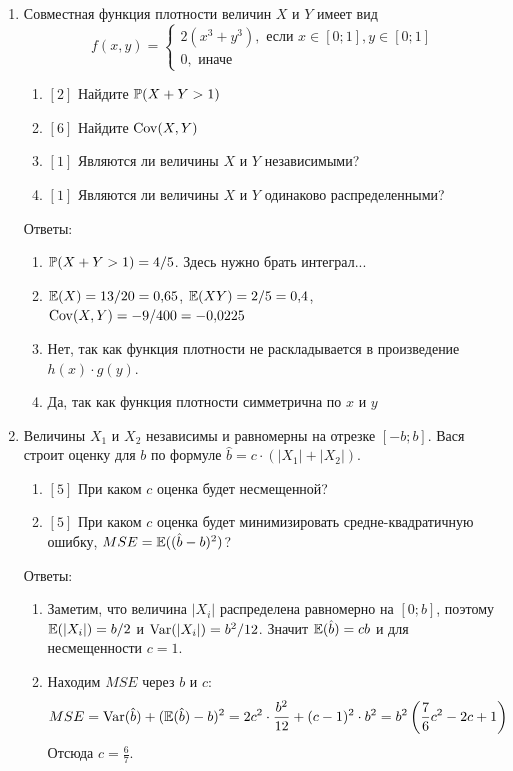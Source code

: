 \documentclass[12pt, a4paper]{article}\usepackage[]{graphicx}\usepackage[]{color}
\begin{document}
		\begin{enumerate}

			\item Совместная функция плотности величин $X$ и $Y$ имеет вид
			\begin{equation}
			f(x,y)=\begin{cases}
			2(x^3+y^3), \mbox{ если } x\in [0;1], y\in [0;1] \\
			0, \mbox{ иначе}
			\end{cases}
			\end{equation}
			\begin{enumerate}
				\item $[2]$ Найдите $\P(X+Y>1)$
				\item $[6]$ Найдите $\Cov(X,Y)$
				\item $[1]$ Являются ли величины $X$ и $Y$ независимыми?
				\item $[1]$ Являются ли величины $X$ и $Y$ одинаково распределенными?
			\end{enumerate}

			Ответы:
			\begin{enumerate}
				\item $\P(X+Y>1)=4/5$. Здесь нужно брать интеграл...
				\item $\E(X)=13/20=0{,}65$, $\E(XY)=2/5=0{,}4$, $\Cov(X,Y)=-9/400=-0{,}0225$
				\item Нет, так как функция плотности не раскладывается в произведение $h(x)\cdot g(y)$.
				\item Да, так как функция плотности симметрична по $x$ и $y$
			\end{enumerate}


			\item Величины $X_1$ и $X_2$ независимы и равномерны на отрезке $[-b;b]$. Вася строит оценку для $b$ по формуле $\hat{b}=c\cdot (|X_{1}|+|X_{2}|)$.
			\begin{enumerate}
				\item $[5]$ При каком $c$ оценка будет несмещенной?
				\item $[5]$ При каком $c$ оценка будет минимизировать средне-квадратичную ошибку, $MSE=\E((\hat{b}-b)^{2})$?
			\end{enumerate}

			Ответы:
			\begin{enumerate}
				\item Заметим, что величина $|X_i|$ распределена равномерно на $[0;b]$, поэтому $\E(|X_i|)=b/2$ и $\Var(|X_i|)=b^2/12$. Значит $\E(\hat{b})=cb$ и для несмещенности $c=1$.
				\item Находим $MSE$ через $b$ и $c$:
				\begin{equation}
				MSE=\Var(\hat{b})+(\E(\hat{b})-b)^2=2c^2\cdot \frac{b^2}{12}+(c-1)^2\cdot b^2=b^2\left(\frac{7}{6}c^2-2c+1\right)
				\end{equation}
				Отсюда $c=\frac{6}{7}$.
			\end{enumerate}



\end{enumerate}
\end{document}
